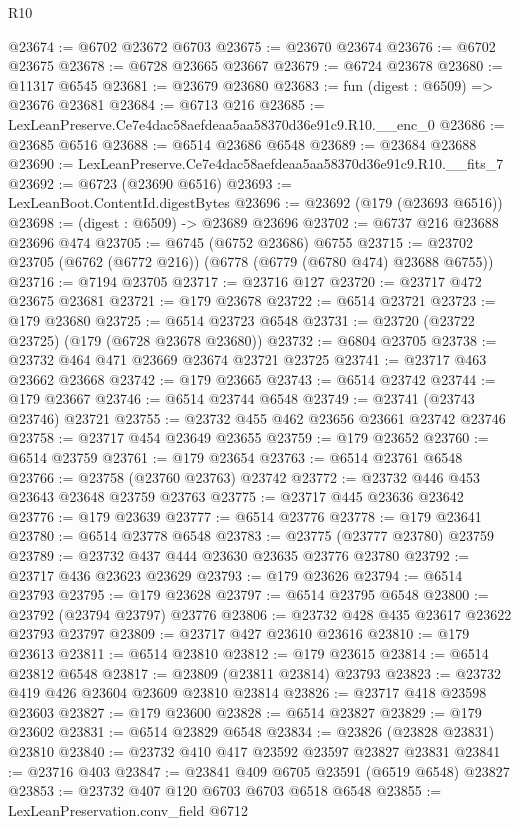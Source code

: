 \begin{lexlean}{R10}
\begin{coremodule}
@23674 := @6702 @23672 @6703
@23675 := @23670 @23674
@23676 := @6702 @23675
@23678 := @6728 @23665 @23667
@23679 := @6724 @23678
@23680 := @11317 @6545
@23681 := @23679 @23680
@23683 := fun (digest : @6509) => @23676 @23681
@23684 := @6713 @216
@23685 := LexLeanPreserve.Ce7e4dac58aefdeaa5aa58370d36e91c9.R10.__enc_0
@23686 := @23685 @6516
@23688 := @6514 @23686 @6548
@23689 := @23684 @23688
@23690 := LexLeanPreserve.Ce7e4dac58aefdeaa5aa58370d36e91c9.R10.__fits_7
@23692 := @6723 (@23690 @6516)
@23693 := LexLeanBoot.ContentId.digestBytes
@23696 := @23692 (@179 (@23693 @6516))
@23698 := (digest : @6509) -> @23689 @23696
@23702 := @6737 @216 @23688 @23696 @474
@23705 := @6745 (@6752 @23686) @6755
@23715 := @23702 @23705 (@6762 (@6772 @216)) (@6778 (@6779 (@6780 @474) @23688 @6755))
@23716 := @7194 @23705
@23717 := @23716 @127
@23720 := @23717 @472 @23675 @23681
@23721 := @179 @23678
@23722 := @6514 @23721
@23723 := @179 @23680
@23725 := @6514 @23723 @6548
@23731 := @23720 (@23722 @23725) (@179 (@6728 @23678 @23680))
@23732 := @6804 @23705
@23738 := @23732 @464 @471 @23669 @23674 @23721 @23725
@23741 := @23717 @463 @23662 @23668
@23742 := @179 @23665
@23743 := @6514 @23742
@23744 := @179 @23667
@23746 := @6514 @23744 @6548
@23749 := @23741 (@23743 @23746) @23721
@23755 := @23732 @455 @462 @23656 @23661 @23742 @23746
@23758 := @23717 @454 @23649 @23655
@23759 := @179 @23652
@23760 := @6514 @23759
@23761 := @179 @23654
@23763 := @6514 @23761 @6548
@23766 := @23758 (@23760 @23763) @23742
@23772 := @23732 @446 @453 @23643 @23648 @23759 @23763
@23775 := @23717 @445 @23636 @23642
@23776 := @179 @23639
@23777 := @6514 @23776
@23778 := @179 @23641
@23780 := @6514 @23778 @6548
@23783 := @23775 (@23777 @23780) @23759
@23789 := @23732 @437 @444 @23630 @23635 @23776 @23780
@23792 := @23717 @436 @23623 @23629
@23793 := @179 @23626
@23794 := @6514 @23793
@23795 := @179 @23628
@23797 := @6514 @23795 @6548
@23800 := @23792 (@23794 @23797) @23776
@23806 := @23732 @428 @435 @23617 @23622 @23793 @23797
@23809 := @23717 @427 @23610 @23616
@23810 := @179 @23613
@23811 := @6514 @23810
@23812 := @179 @23615
@23814 := @6514 @23812 @6548
@23817 := @23809 (@23811 @23814) @23793
@23823 := @23732 @419 @426 @23604 @23609 @23810 @23814
@23826 := @23717 @418 @23598 @23603
@23827 := @179 @23600
@23828 := @6514 @23827
@23829 := @179 @23602
@23831 := @6514 @23829 @6548
@23834 := @23826 (@23828 @23831) @23810
@23840 := @23732 @410 @417 @23592 @23597 @23827 @23831
@23841 := @23716 @403
@23847 := @23841 @409 @6705 @23591 (@6519 @6548) @23827
@23853 := @23732 @407 @120 @6703 @6703 @6518 @6548
@23855 := LexLeanPreservation.conv_field @6712

\end{coremodule}
\end{lexlean}
